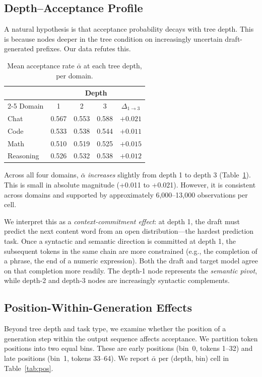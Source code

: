 \documentclass[conference]{IEEEtran}
\begin{document}
\subsection{Depth--Acceptance Profile}

A natural hypothesis is that acceptance probability decays with tree depth.
This is because nodes deeper in the tree condition on increasingly uncertain draft-generated
prefixes. Our data refutes this.

\begin{table}[h]
\centering
\caption{Mean acceptance rate $\bar{\alpha}$ at each tree depth, per domain.}
\label{tab:depth}
\begin{tabular}{lcccc}
\toprule
 & \multicolumn{4}{c}{Depth} \\
\cmidrule(lr){2-5}
Domain & 1 & 2 & 3 & $\Delta_{1\to3}$ \\
\midrule
Chat      & 0.567 & 0.553 & 0.588 & $+0.021$ \\
Code      & 0.533 & 0.538 & 0.544 & $+0.011$ \\
Math      & 0.510 & 0.519 & 0.525 & $+0.015$ \\
Reasoning & 0.526 & 0.532 & 0.538 & $+0.012$ \\
\bottomrule
\end{tabular}
\end{table}

Across all four domains, $\bar\alpha$ \emph{increases} slightly from depth 1
to depth 3 (Table~\ref{tab:depth}). This is small in absolute magnitude
(+0.011 to +0.021). However, it is consistent across domains and supported by
approximately 6,000--13,000 observations per cell.

We interpret this as a \emph{context-commitment effect}: at depth 1, the draft
must predict the next content word from an open distribution---the hardest
prediction task. Once a syntactic and semantic direction is committed at depth 1,
the subsequent tokens in the same chain are more constrained (e.g., the completion
of a phrase, the end of a numeric expression). Both the draft and target model
agree on that completion more readily. The depth-1 node
represents the \emph{semantic pivot}, while depth-2 and depth-3 nodes are
increasingly syntactic complements.

\subsection{Position-Within-Generation Effects}

Beyond tree depth and task type, we examine whether the position of a
generation step within the output sequence affects acceptance. We partition token positions into two equal bins. These are early positions
(bin~0, tokens 1--32) and late positions (bin~1, tokens 33--64). We report
$\bar\alpha$ per (depth, bin) cell in Table~\ref{tab:pos}.
\end{document}
